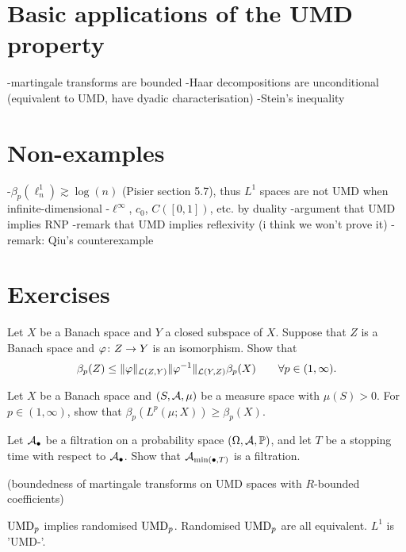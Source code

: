 \section{Basic applications of the UMD property}

-martingale transforms are bounded
-Haar decompositions are unconditional (equivalent to UMD, have dyadic characterisation)
-Stein's inequality

\section{Non-examples}

-$\beta_{p}(\ell^{1}_{n}) \gtrsim \log(n)$ (Pisier section 5.7), thus $L^1$ spaces are not UMD when infinite-dimensional
-$\ell^\infty$, $c_{0}$, $C([0,1])$, etc. by duality
-argument that UMD implies RNP
-remark that UMD implies reflexivity (i think we won't prove it)
-remark: Qiu's counterexample

\section*{Exercises}

\begin{exercise}\label{ex:UMD-isomorphism}
  Let $X$ be a Banach space and $Y$ a closed subspace of $X$.
  Suppose that $Z$ is a Banach space and $\varphi \colon Z \rightarrow Y$ is an isomorphism.
  Show that 
  \begin{equation*}
    \beta_{p}(Z) \leq \|\varphi\|_{\mathcal{L}(Z,Y)} \|\varphi^{-1}\|_{\mathcal{L}(Y,Z)} \beta_{p}(X) \qquad \forall p \in (1,\infty).
  \end{equation*}
\end{exercise}

\begin{exercise}\label{ex:UMD-Lp-reverse}
  Let $X$ be a Banach space and $(S,\mathcal{A},\mu)$ be a measure space with $\mu(S) > 0$.
  For $p \in (1,\infty)$, show that $\beta_{p}(L^p(\mu;X)) \geq \beta_{p}(X)$.
\end{exercise}

\begin{exercise}\label{ex:stopped-filtration}
  Let $\mathcal{A}_{\bullet}$ be a filtration on a probability space $(\Omega,\mathcal{A},\mathbb{P})$, and let $T$ be a stopping time with respect to $\mathcal{A}_{\bullet}$.
  Show that $\mathcal{A}_{\min(\bullet,T)}$ is a filtration.
\end{exercise}

\begin{exercise}
  (boundedness of martingale transforms on UMD spaces with $R$-bounded coefficients)
\end{exercise}

\begin{exercise}
  $\mathrm{UMD}_{p}$ implies randomised $\mathrm{UMD}_{p}$.
  Randomised $\mathrm{UMD}_{p}$ are all equivalent.
  $L^1$ is 'UMD-'.
\end{exercise}



